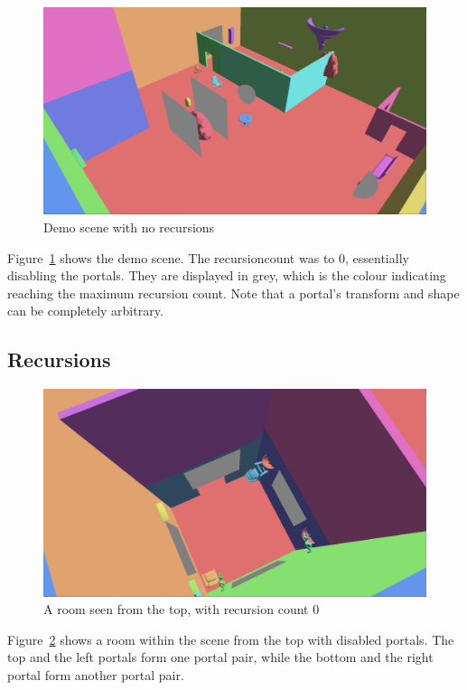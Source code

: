\begin{figure}[H]
	\centering
	\includegraphics[width=\linewidth]{images/portals.png}
	\caption{Demo scene with no recursions}
	\label{fig:demodisabled}
\end{figure}


Figure~\ref{fig:demodisabled} shows the demo scene. The \gls{recursioncount} was to 0, essentially disabling the portals. They are displayed in grey, which is the colour indicating reaching the maximum recursion count. Note that a portal's transform and shape can be completely arbitrary.

\subsection{Recursions}

\begin{figure}[H]
	\centering
	\includegraphics[width=\linewidth]{images/room.png}
	\caption{A room seen from the top, with recursion count 0}
	\label{fig:roomlayout}
\end{figure}

Figure~\ref{fig:roomlayout} shows a room within the scene from the top with disabled portals. The top and the left portals form one portal pair, while the bottom and the right portal form another portal pair.

